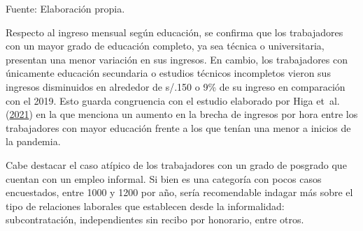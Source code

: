 \documentclass[
  letterpaper,
  12pt,
  oneside,
  spanish,
  doublespacing,
  headsepline,
  parskip]{MastersDoctoralThesis}
\begin{document}
\noindent \small Fuente: Elaboración propia. \normalsize

Respecto al ingreso mensual según educación, se confirma que los
trabajadores con un mayor grado de educación completo, ya sea técnica o
universitaria, presentan una menor variación en sus ingresos. En cambio,
los trabajadores con únicamente educación secundaria o estudios técnicos
incompletos vieron sus ingresos disminuidos en alrededor de s/.150 o 9\%
de su ingreso en comparación con el 2019. Esto guarda congruencia con el
estudio elaborado por Higa et~al.
(\protect\hyperlink{ref-higa2021}{2021}) en la que menciona un aumento
en la brecha de ingresos por hora entre los trabajadores con mayor
educación frente a los que tenían una menor a inicios de la pandemia.

Cabe destacar el caso atípico de los trabajadores con un grado de
posgrado que cuentan con un empleo informal. Si bien es una categoría
con pocos casos encuestados, entre 1000 y 1200 por año, sería
recomendable indagar más sobre el tipo de relaciones laborales que
establecen desde la informalidad: subcontratación, independientes sin
recibo por honorario, entre otros.
\end{document}
